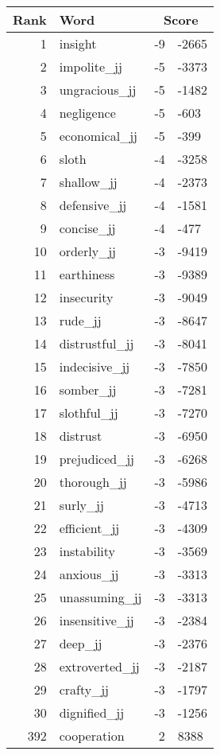 \begin{longtable}[!htbp]{| rlr@{.}l |}
    \hline
    \textbf{Rank} & \textbf{Word} & \multicolumn{2}{c|}{\textbf{Score}} \\
    \hline
    \endhead
    1 & insight & -9 & -2665 \\
    2 & impolite\_jj & -5 & -3373 \\
    3 & ungracious\_jj & -5 & -1482 \\
    4 & negligence & -5 & -603 \\
    5 & economical\_jj & -5 & -399 \\
    6 & sloth & -4 & -3258 \\
    7 & shallow\_jj & -4 & -2373 \\
    8 & defensive\_jj & -4 & -1581 \\
    9 & concise\_jj & -4 & -477 \\
    10 & orderly\_jj & -3 & -9419 \\
    11 & earthiness & -3 & -9389 \\
    12 & insecurity & -3 & -9049 \\
    13 & rude\_jj & -3 & -8647 \\
    14 & distrustful\_jj & -3 & -8041 \\
    15 & indecisive\_jj & -3 & -7850 \\
    16 & somber\_jj & -3 & -7281 \\
    17 & slothful\_jj & -3 & -7270 \\
    18 & distrust & -3 & -6950 \\
    19 & prejudiced\_jj & -3 & -6268 \\
    20 & thorough\_jj & -3 & -5986 \\
    21 & surly\_jj & -3 & -4713 \\
    22 & efficient\_jj & -3 & -4309 \\
    23 & instability & -3 & -3569 \\
    24 & anxious\_jj & -3 & -3313 \\
    25 & unassuming\_jj & -3 & -3313 \\
    26 & insensitive\_jj & -3 & -2384 \\
    27 & deep\_jj & -3 & -2376 \\
    28 & extroverted\_jj & -3 & -2187 \\
    29 & crafty\_jj & -3 & -1797 \\
    30 & dignified\_jj & -3 & -1256 \\
    392 & cooperation & 2 & 8388 \\

\end{longtable}
